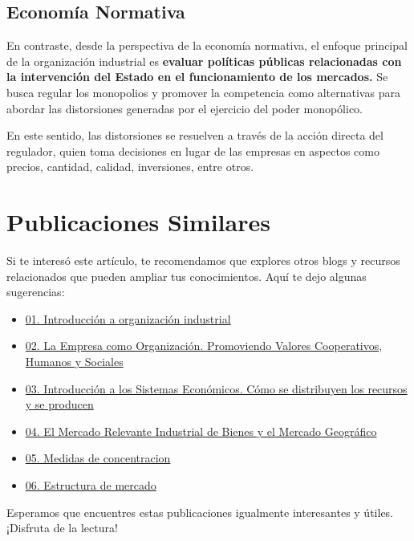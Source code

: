 \documentclass[
  a4paper,
]{article}
\begin{document}
\hypertarget{economuxeda-normativa}{%
\subsection{Economía Normativa}\label{economuxeda-normativa}}

En contraste, desde la perspectiva de la economía normativa, el enfoque
principal de la organización industrial es \textbf{evaluar políticas
públicas relacionadas con la intervención del Estado en el
funcionamiento de los mercados.} Se busca regular los monopolios y
promover la competencia como alternativas para abordar las distorsiones
generadas por el ejercicio del poder monopólico.

En este sentido, las distorsiones se resuelven a través de la acción
directa del regulador, quien toma decisiones en lugar de las empresas en
aspectos como precios, cantidad, calidad, inversiones, entre otros.

\hypertarget{publicaciones-similares}{%
\section{Publicaciones Similares}\label{publicaciones-similares}}

Si te interesó este artículo, te recomendamos que explores otros blogs y
recursos relacionados que pueden ampliar tus conocimientos. Aquí te dejo
algunas sugerencias:

\begin{itemize}
\item
  \href{../2023-06-12-introducion-organizacion-industrial-oi-cap1/index.qmd}{01.
  Introducción a organización industrial}
\item
  \href{../2023-06-13-empresa-como-organizacion-oi-cap1/index.qmd}{02.
  La Empresa como Organización. Promoviendo Valores Cooperativos,
  Humanos y Sociales}
\item
  \href{../2023-06-13-sistemas-economicos-oi.cap1/index.qmd}{03.
  Introducción a los Sistemas Económicos. Cómo se distribuyen los
  recursos y se producen}
\item
  \href{../2023-06-15-mercado-relevante-oi-cap2/index.qmd}{04. El
  Mercado Relevante Industrial de Bienes y el Mercado Geográfico}
\item
  \href{../2023-06-16-concentracion-poder-oi-cap3/index.qmd}{05. Medidas
  de concentracion}
\item
  \href{../2023-06-17-estructura-mercado-oi-cap4/index.qmd}{06.
  Estructura de mercado}
\end{itemize}

Esperamos que encuentres estas publicaciones igualmente interesantes y
útiles. ¡Disfruta de la lectura!


\printbibliography
\end{document}
